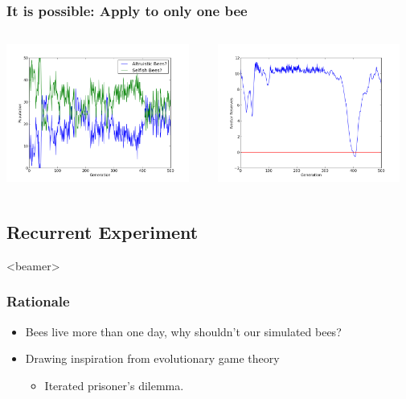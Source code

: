 \documentclass{beamer}
\begin{document}
      \begin{frame}[c]\frametitle{It is possible: Apply to only one bee}
        \begin{columns}
        \begin{column}{0.48\textwidth}
          \includegraphics[width=6cm]{results/selfish_modify.png}
        \end{column}
        \begin{column}{0.48\textwidth}
          \includegraphics[width=6cm]{results/selfish_modify_nectar.png}
        \end{column}
        \end{columns}
      \end{frame}


 
    \subsection{Recurrent Experiment} %
    \label{sub:recurrent_experiment}
      \setcounter{tocdepth}{2}
        \begin{frame}<beamer>
        \end{frame}
      \setcounter{tocdepth}{3}
    
      \begin{frame}[c]\frametitle{Rationale}
        \begin{itemize}
          \item Bees live more than one day, why shouldn't our simulated bees?
          \item Drawing inspiration from evolutionary game theory
          \begin{itemize}
            \item Iterated prisoner's dilemma.
          \end{itemize}
        \end{itemize}
      \end{frame}
\end{document}
